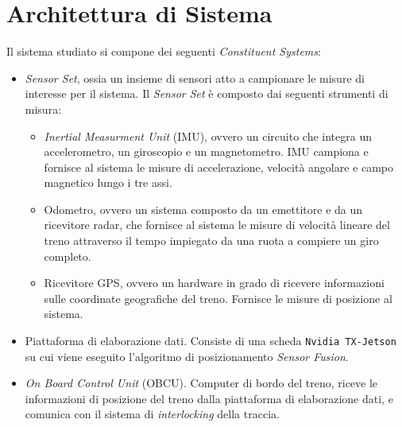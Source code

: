 \chapter{Architettura di Sistema}
Il sistema studiato si compone dei seguenti \emph{Constituent Systems}:
\begin{itemize}
	\item \emph{Sensor Set}, ossia un insieme di sensori atto a campionare le misure di interesse per il sistema. Il \emph{Sensor Set} \`e composto dai seguenti strumenti di misura:
	\begin{itemize}
		\item \emph{Inertial Measurment Unit} (IMU), ovvero un circuito che integra un accelerometro, un giroscopio e un magnetometro. IMU campiona e fornisce al sistema le misure di accelerazione, velocit\`a angolare e campo magnetico lungo i tre assi.
		\item Odometro, ovvero un sistema composto da un emettitore e da un ricevitore radar, che fornisce al sistema le misure di velocit\`a lineare del treno attraverso il tempo impiegato da una ruota a compiere un giro completo.
		\item Ricevitore GPS, ovvero un hardware in grado di ricevere informazioni sulle coordinate geografiche del treno. Fornisce le misure di posizione al sistema.

	\end{itemize}
	\item Piattaforma di elaborazione dati. Consiste di una scheda \texttt{Nvidia TX-Jetson} su cui viene eseguito l'algoritmo di posizionamento \emph{Sensor Fusion}.
	\item \emph{On Board Control Unit} (OBCU). Computer di bordo del treno, riceve le informazioni di posizione del treno dalla piattaforma di elaborazione dati, e comunica con il sistema di \emph{interlocking} della traccia.
\end{itemize}